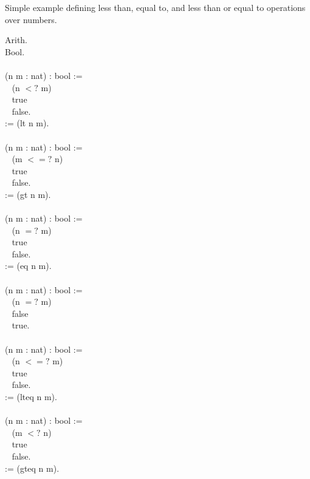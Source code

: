 
Simple example defining less than, equal to, and less than or equal to operations over numbers.

\begin{code}
	 Arith.	\\
	\Load Bool.
	\\ \\
	\Definition {} (n m : nat) : bool :=		\\ \-\ \qquad
		  \If (n $<?$ m)					\\ \-\ \qquad
		  \Then true					\\ \-\ \qquad
		  \Else false.					\\
	\Notation {} := (lt n m).
	\\ \\
	\Definition {} (n m : nat) : bool :=	\\ \-\ \qquad
		  \If (m $<=?$ n)				\\ \-\ \qquad
		  \Then true					\\ \-\ \qquad
		  \Else false.					\\
	\Notation {} := (gt n m).
	\\ \\
	\Definition {} (n m : nat) : bool :=	\\ \-\ \qquad
		  \If (n $=?$ m)					\\ \-\ \qquad
		  \Then true					\\ \-\ \qquad
		  \Else false.					\\
	\Notation {} := (eq n m).
	\\ \\
	\Definition {} (n m : nat) : bool :=	\\ \-\ \qquad
		  \If (n $=?$ m)					\\ \-\ \qquad
		  \Then false					\\ \-\ \qquad
		  \Else true.					
	\\ \\
	\Definition {} (n m : nat) : bool :=	\\ \-\ \qquad
		  \If (n $<=?$ m)				\\ \-\ \qquad
		  \Then true					\\ \-\ \qquad
		  \Else false.					\\
	\Notation {} := (lteq n m).					
	\\ \\
	\Definition {} (n m : nat) : bool :=	\\ \-\ \qquad
		  \If (m $<?$ n)					\\ \-\ \qquad
		  \Then true					\\ \-\ \qquad
		  \Else false.					\\
	\Notation {} := (gteq n m).
\end{code}











